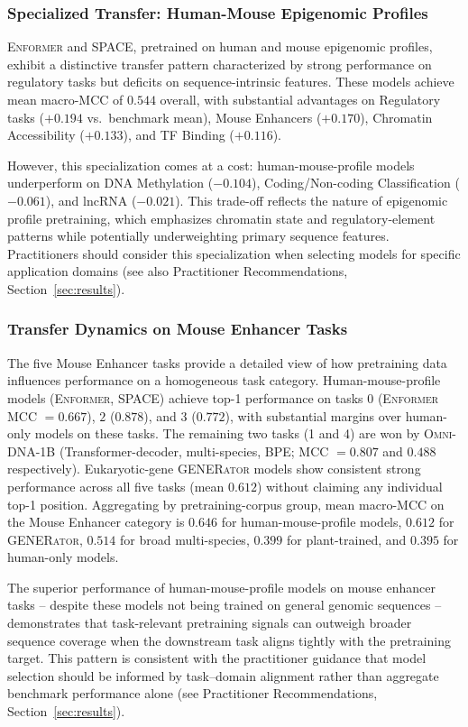 \documentclass{llmxive}
\begin{document}
\subsubsection{Specialized Transfer: Human-Mouse Epigenomic Profiles}

\textsc{Enformer} and \textsc{SPACE}, pretrained on human and mouse
epigenomic profiles, exhibit a distinctive transfer pattern
characterized by strong performance on regulatory tasks but
deficits on sequence-intrinsic features. These models achieve mean
macro-MCC of $0.544$ overall, with substantial advantages on
Regulatory tasks ($+0.194$ vs.\ benchmark mean), Mouse Enhancers
($+0.170$), Chromatin Accessibility ($+0.133$), and TF Binding
($+0.116$).

However, this specialization comes at a cost: human-mouse-profile
models underperform on DNA Methylation ($-0.104$), Coding/Non-coding
Classification ($-0.061$), and lncRNA ($-0.021$). This trade-off
reflects the nature of epigenomic profile pretraining, which
emphasizes chromatin state and regulatory-element patterns while
potentially underweighting primary sequence features. Practitioners
should consider this specialization when selecting models for
specific application domains (see also Practitioner Recommendations,
Section~\ref{sec:results}).

\subsubsection{Transfer Dynamics on Mouse Enhancer Tasks}

The five Mouse Enhancer tasks provide a detailed view of how
pretraining data influences performance on a homogeneous task
category. Human-mouse-profile models (\textsc{Enformer},
\textsc{SPACE}) achieve top-1 performance on tasks $0$
(\textsc{Enformer} MCC $= 0.667$), $2$ ($0.878$), and $3$ ($0.772$),
with substantial margins over human-only models on these tasks.
The remaining two tasks (1 and 4) are won by \textsc{Omni-DNA-1B}
(Transformer-decoder, multi-species, BPE; MCC $= 0.807$ and
$0.488$ respectively). Eukaryotic-gene \textsc{GENERator} models
show consistent strong performance across all five tasks (mean
$0.612$) without claiming any individual top-1 position. Aggregating
by pretraining-corpus group, mean macro-MCC on the Mouse Enhancer
category is $0.646$ for human-mouse-profile models, $0.612$ for
\textsc{GENERator}, $0.514$ for broad multi-species, $0.399$ for
plant-trained, and $0.395$ for human-only models.

The superior performance of human-mouse-profile models on mouse
enhancer tasks -- despite these models not being trained on
general genomic sequences -- demonstrates that task-relevant
pretraining signals can outweigh broader sequence coverage when
the downstream task aligns tightly with the pretraining target.
This pattern is consistent with the practitioner guidance that
model selection should be informed by task--domain alignment
rather than aggregate benchmark performance alone (see
Practitioner Recommendations, Section~\ref{sec:results}).
\end{document}
